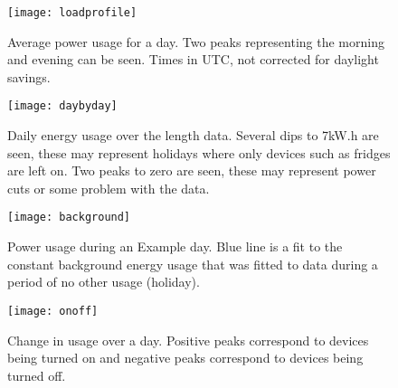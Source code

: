 \documentclass[a4paper,12pt]{article}
\begin{document}

\begin{figure}[htb]
  \caption{Average power usage for a day. Two peaks representing the morning and evening can be seen. Times in UTC, not corrected for daylight savings.}
  \centering
    \texttt{[image: loadprofile]}
\end{figure}


\begin{figure}[htb]
  \caption{Daily energy usage over the length data. Several dips to 7kW.h are seen, these may represent holidays where only devices such as fridges are left on. Two peaks to zero are seen, these may represent power cuts or some problem with the data.}
  \centering
    \texttt{[image: daybyday]}
\end{figure}

\begin{figure}[htb]
  \caption{Power usage during an Example day. Blue line is a fit to the constant background energy usage that was fitted to data during a period of no other usage (holiday).}
  \centering
    \texttt{[image: background]}
\end{figure}


\begin{figure}[htb]
  \caption{Change in usage over a day. Positive peaks correspond to devices being turned on and negative peaks correspond to devices being turned off.}
  \centering
    \texttt{[image: onoff]}
\end{figure}
\end{document}
